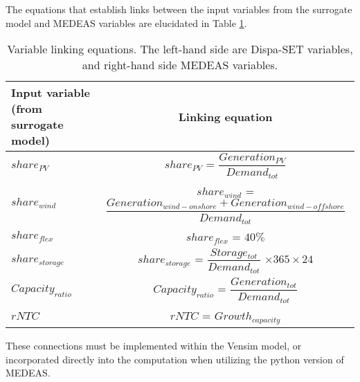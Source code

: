 The equations that establish links between the input variables from the surrogate model and MEDEAS variables are elucidated in Table \ref{tab:linking-equations}.

\begin{table}[h]
    \centering
    \begin{tabular}{|m{3.6cm}|c|}
    \hline 
    Input variable (from surrogate model) & Linking equation \\ \hline
    {\color{blue} $share_{PV}$} & {\color{blue} $share_{PV}$ = \color{red} $\dfrac{Generation_{PV}}{Demand_{tot}}$ } \\ \hline 
    {\color{blue} $share_{wind}$} & {\color{blue} $share_{wind}$ = \color{red} $\dfrac{Generation_{wind-onshore} + Generation_{wind-offshore}}{Demand_{tot}}$} \\ \hline 
    {\color{blue} $share_{flex}$} & {\color{blue} $share_{flex}$} = $40\%$ \\ \hline 
    {\color{blue} $share_{storage}$} & {\color{blue} $share_{storage}$ = \color{red} $\dfrac{Storage_{tot}}{Demand_{tot}}$} $\times 365\times 24$ \\ \hline 
    {\color{blue} $Capacity_{ratio}$} & {\color{blue} $Capacity_{ratio}$ = \color{red} $\dfrac{Generation_{tot}}{Demand_{tot}}$} \\ \hline 
    {\color{blue} $rNTC$} & {\color{blue} $rNTC$ = \color{red} $Growth_{capacity}$} \\ \hline 
    \end{tabular}
    \caption{Variable linking equations. The left-hand side are Dispa-SET variables, and right-hand side MEDEAS variables.}
    \label{tab:linking-equations}
\end{table}

These connections must be implemented within the Vensim model, or incorporated directly into the computation when utilizing the python version of MEDEAS.